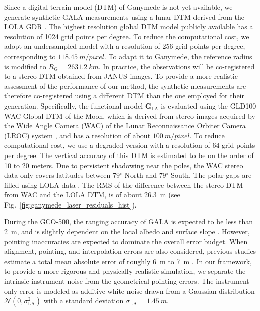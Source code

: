 \documentclass[lineno, pdflatex,sn-mathphys-ay]{sn-jnl}
\newcommand{\degr}{\ensuremath{^\circ}}
\theoremstyle{thmstyleone}%
\theoremstyle{thmstyletwo}%
\theoremstyle{thmstylethree}%
\renewcommand{\vec}[1]{\boldsymbol{#1}}
\begin{document}
Since a digital terrain model (DTM) of Ganymede is not yet available, we generate synthetic GALA measurements using a lunar DTM derived from the LOLA GDR \citep{Neumann2014LOLA_GDR}. 
The highest resolution global DTM model publicly available has a resolution of 1024 grid points per degree. To reduce the computational cost, we adopt an undersampled model with a resolution of 256 grid points per degree, corresponding to $\SI{118.45}{m/pixel}$. To adapt it to Ganymede, the reference radius is modified to $R_{\mathrm{G}} = \SI{2631.2}{km}$.
%
In practice, the observations will be co-registered to a stereo DTM obtained from JANUS images. To provide a more realistic assessment of the performance of our method, the synthetic measurements are therefore co-registered using a different DTM than the one employed for their generation. Specifically, the functional model $\vec{G}_{\mathrm{LA}}$ is evaluated using the GLD100 WAC Global DTM of the Moon, which is derived from stereo images acquired by the Wide Angle Camera (WAC) of the Lunar Reconnaissance Orbiter Camera (LROC) system \citep{2012JGRE..117.0H17S}, and has a resolution of about $\SI{100}{m/pixel}$. To reduce computational cost, we use a degraded version with a resolution of 64 grid points per degree. The vertical accuracy of this DTM is estimated to be on the order of 10 to 20 meters. Due to persistent shadowing near the poles, the WAC stereo data only covers latitudes between $79\degr$ North and $79\degr$ South. The polar gaps are filled using LOLA data \citep{2010GeoRL..3718204S}. %
%
The RMS of the difference between the stereo DTM from WAC and the  LOLA DTM, is of about \SI{26.3}{\meter} (see Fig.~\ref{fig:ganymede_laser_residuals_hist}).

During the GCO-500, the ranging accuracy of GALA is expected to be less than \SI{2}{m}, and is slightly dependent on the local albedo and surface slope \citep{2015P&SS..117..184S, 2018P&SS..159...84S, 2019Geosc...9..320S}. However, pointing inaccuracies are expected to dominate the overall error budget. When alignment, pointing, and interpolation errors are also considered, previous studies estimate a total mean absolute error of roughly \SI{6}{m} to \SI{7}{m} \citep{2015P&SS..117..184S}.
%
In our framework, to provide a more rigorous and physically realistic simulation, we separate the intrinsic instrument noise from the geometrical pointing errors. The instrument-only error is modeled as additive white noise drawn from a Gaussian distribution $\mathcal{N}(0, \sigma_{\mathrm{LA}}^2)$ with a standard deviation $\sigma_{\mathrm{LA}} = \SI{1.45}{m}$.
\end{document}
